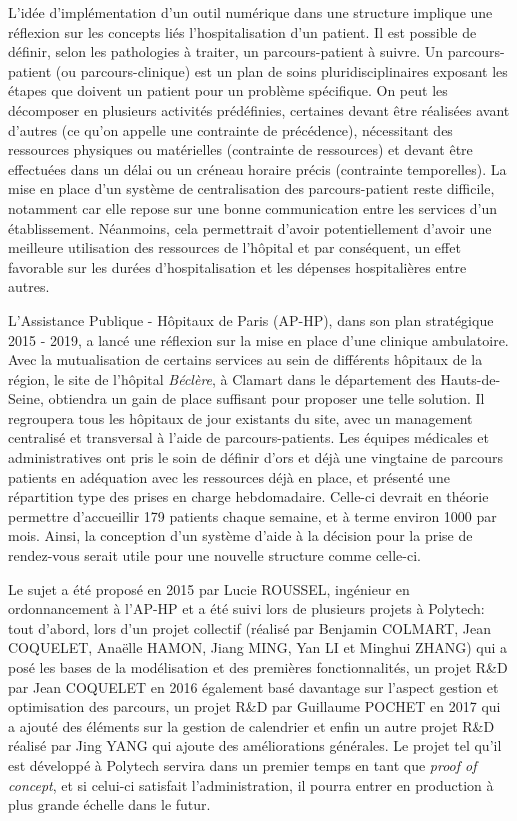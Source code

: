\documentclass{polytech/polytech}
\begin{document}
L'idée d'implémentation d'un outil numérique dans une structure implique une réflexion sur les concepts liés l'hospitalisation d'un patient. Il est possible de définir, selon les pathologies à traiter, un parcours-patient à suivre. Un parcours-patient (ou parcours-clinique) est un plan de soins pluridisciplinaires exposant les étapes que doivent un patient pour un problème spécifique. On peut les décomposer en plusieurs activités prédéfinies, certaines devant être réalisées avant d'autres (ce qu'on appelle une contrainte de précédence), nécessitant des ressources physiques ou matérielles (contrainte de ressources) et devant être effectuées dans un délai ou un créneau horaire précis (contrainte temporelles). La mise en place d'un système de centralisation des parcours-patient reste difficile, notamment car elle repose sur une bonne communication entre les services d'un établissement. Néanmoins, cela permettrait d'avoir potentiellement d'avoir une meilleure utilisation des ressources de l'hôpital et par conséquent, un effet favorable sur les durées d'hospitalisation et les dépenses hospitalières entre autres.

L'Assistance Publique - Hôpitaux de Paris (AP-HP), dans son plan stratégique 2015 - 2019, a lancé une réflexion sur la mise en place d'une clinique ambulatoire. Avec la mutualisation de certains services au sein de différents hôpitaux de la région, le site de l'hôpital \textit{Béclère}, à Clamart dans le département des Hauts-de-Seine, obtiendra un gain de place suffisant pour proposer une telle solution. Il regroupera tous les hôpitaux de jour existants du site, avec un management centralisé et transversal à l'aide de parcours-patients. Les équipes médicales et administratives ont pris le soin de définir d'ors et déjà une vingtaine de parcours patients en adéquation avec les ressources déjà en place, et présenté une répartition type des prises en charge hebdomadaire. Celle-ci devrait en théorie permettre d'accueillir 179 patients chaque semaine, et à terme environ 1000 par mois. Ainsi, la conception d'un système d'aide à la décision pour la prise de rendez-vous serait utile pour une nouvelle structure comme celle-ci.

Le sujet a été proposé en 2015 par Lucie ROUSSEL, ingénieur en ordonnancement à l'AP-HP et a été suivi lors de plusieurs projets à Polytech: tout d'abord, lors d'un projet collectif (réalisé par Benjamin COLMART, Jean COQUELET, Anaëlle HAMON, Jiang MING, Yan LI et Minghui ZHANG) qui a posé les bases de la modélisation et des premières fonctionnalités, un projet R\&D par Jean COQUELET en 2016 également basé davantage sur l'aspect gestion et optimisation des parcours, un projet R\&D par Guillaume POCHET en 2017 qui a ajouté des éléments sur la gestion de calendrier et enfin un autre projet R\&D réalisé par Jing YANG qui ajoute des améliorations générales. Le projet tel qu'il est développé à Polytech servira dans un premier temps en tant que \textit{proof of concept}, et si celui-ci satisfait l'administration, il pourra entrer en production à plus grande échelle dans le futur.
\end{document}
